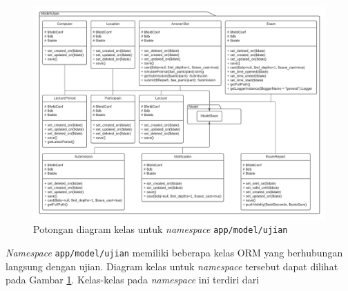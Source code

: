     
    \begin{figure}
        \centering
        \includegraphics[width=0.8\paperheight]{Gambar/classmap-be/Classmap - app-model-ujian.pdf}
        \caption{Potongan diagram kelas untuk \textit{namespace}
        \texttt{app/model/ujian}}
        \label{fig:classmap_app-model-ujian}
    \end{figure}
    \textit{Namespace} \texttt{app/model/ujian} memiliki beberapa kelas ORM yang
    berhubungan langsung dengan ujian. Diagram kelas untuk \textit{namespace}
    tersebut dapat dilihat pada Gambar \ref{fig:classmap_app-model-ujian}.
    Kelas-kelas pada \textit{namespace} ini terdiri dari
